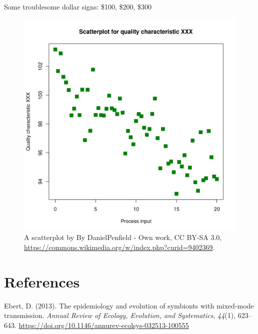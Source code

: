 \documentclass[10pt]{article}
\begin{document}
Some troublesome dollar signs: \$100, \$200, \$300
\begin{figure}[h!]
\begin{center}
\includegraphics[width=0.70\columnwidth]{figures/scatterplot/scatterplot}
\caption{{A scatterplot by By DanielPenfield - Own work, CC BY-SA 3.0,
\url{https://commons.wikimedia.org/w/index.php?curid=9402369}.
{\label{286335}}%
}}
\end{center}
\end{figure}

\clearpage
\section*{References}\sloppy
{}
\label{csl:1}Ebert, D. (2013). {The epidemiology and evolution of symbionts with mixed-mode transmission}. \textit{Annual Review of Ecology, Evolution, and Systematics}, \textit{44}(1), 623–643. \url{https://doi.org/10.1146/annurev-ecolsys-032513-100555}
\end{document}
